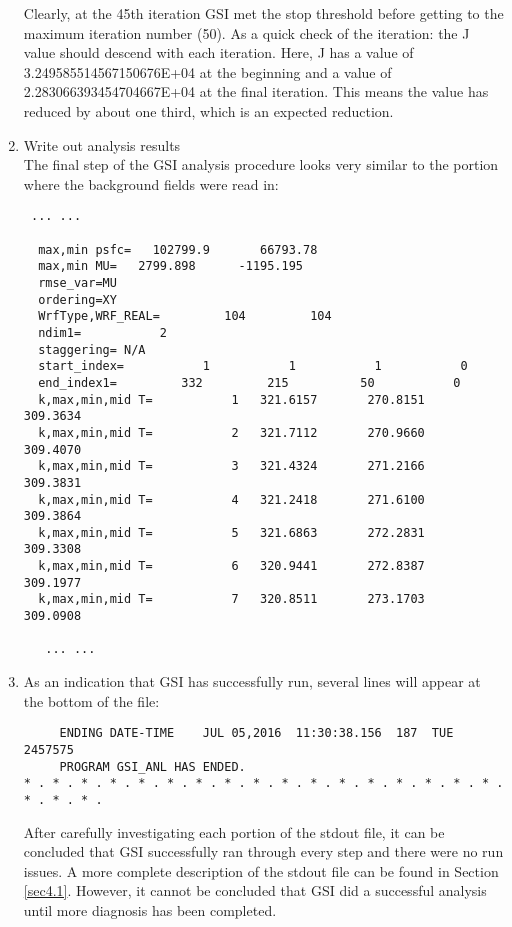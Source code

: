 \begin{enumerate}
Clearly, at the 45th iteration GSI met the stop threshold before getting to the maximum iteration number (50).  As a quick check of the iteration: the J value should descend with each iteration.  Here, J has a value of 3.249585514567150676E+04 at the beginning and a value of 2.283066393454704667E+04 at the final iteration.  This means the value has reduced by about one third, which is an expected reduction.\\

\item Write out analysis results\\

The final step of the GSI analysis procedure looks very similar to the portion where the background fields were read in:

\begin{scriptsize}
\begin{verbatim}
 ... ...

  max,min psfc=   102799.9       66793.78
  max,min MU=   2799.898      -1195.195
  rmse_var=MU
  ordering=XY
  WrfType,WRF_REAL=         104         104
  ndim1=           2
  staggering= N/A
  start_index=           1           1           1           0
  end_index1=         332         215          50           0
  k,max,min,mid T=           1   321.6157       270.8151       309.3634
  k,max,min,mid T=           2   321.7112       270.9660       309.4070
  k,max,min,mid T=           3   321.4324       271.2166       309.3831
  k,max,min,mid T=           4   321.2418       271.6100       309.3864
  k,max,min,mid T=           5   321.6863       272.2831       309.3308
  k,max,min,mid T=           6   320.9441       272.8387       309.1977
  k,max,min,mid T=           7   320.8511       273.1703       309.0908

   ... ...
\end{verbatim}
\end{scriptsize}

\item As an indication that GSI has successfully run, several lines will appear at the bottom of the file:

\begin{scriptsize}
\begin{verbatim}
     ENDING DATE-TIME    JUL 05,2016  11:30:38.156  187  TUE   2457575
     PROGRAM GSI_ANL HAS ENDED.
* . * . * . * . * . * . * . * . * . * . * . * . * . * . * . * . * . * . * . * .
\end{verbatim}
\end{scriptsize}

After carefully investigating each portion of the stdout file, it can be concluded that GSI successfully ran through every step and there were no run issues. A more complete description of the stdout file can be found in Section \ref{sec4.1}. However, it cannot be concluded that GSI did a successful analysis until more diagnosis has been completed.

\end{enumerate}

